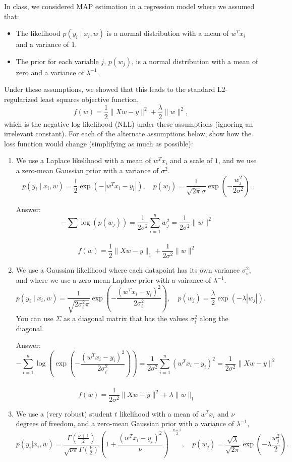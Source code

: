 \documentclass{article}
\def\ans#1{\par\gre{Answer: #1}}
\def\blu#1{{\color{blu}#1}}
\def\gre#1{{\color{gre}#1}}
\def\norm#1{\|#1\|}
\def\items#1{\begin{itemize}#1\end{itemize}}
\def\enum#1{\begin{enumerate}#1\end{enumerate}}
\begin{document}
In class, we considered MAP estimation in a regression model where we assumed that:
\items{
\item The likelihood $p(y_i \mid x_i, w)$ is a normal distribution with a mean of $w^Tx_i$ and a variance of $1$.
\item The prior for each variable $j$, $p(w_j)$, is a normal distribution with a mean of zero and a variance of $\lambda^{-1}$.
}
Under these assumptions, we showed that this leads to the standard L2-regularized least squares objective function,
\[
f(w) = \frac{1}{2}\norm{Xw - y}^2 + \frac \lambda 2 \norm{w}^2,
\]
which is the negative log likelihood (NLL) under these assumptions (ignoring an irrelevant constant).
\blu{For each of the alternate assumptions below, show how the loss function would change} (simplifying as much as possible):
\enum{
\item We use a Laplace likelihood with a mean of $w^Tx_i$ and a scale of $1$, and we use a zero-mean Gaussian prior with a variance of $\sigma^2$.
\[
p(y_i \mid x_i, w) = \frac 1 2 \exp(-|w^Tx_i - y_i|), \quad p(w_j) = \frac{1}{\sqrt{2\pi}\sigma}\exp\left(-\frac{w_j^2}{2\sigma^2}\right).
\]
\ans{
\[-\sum\log(p(w_j)) = \frac{1}{2\sigma^2} \sum_{i=1}^n w_j^2 = \frac{1}{2\sigma^2}\norm{w}^2\]\\
\[f(w) = \frac{1}{2}\norm{Xw - y}_1 +\frac{1}{2\sigma^2}\norm{w}^2 \]}
\item We use a Gaussian likelihood where each datapoint has its own variance $\sigma_i^2$, and where we use a zero-mean Laplace prior with a vairance of $\lambda^{-1}$.
\[
p(y_i \mid x_i,w) = \frac{1}{\sqrt{2\sigma_i^2\pi}}\exp\left(-\frac{(w^Tx_i - y_i)^2}{2\sigma_i^2}\right), \quad p(w_j) = \frac{\lambda}{2}\exp(-\lambda|w_j|).
\]
You can use $\Sigma$ as a diagonal matrix that has the values $\sigma_i^2$ along the diagonal.
\ans{
	\[ -\sum_{i=1}^n\log(\exp(-\frac{(w^Tx_i - y_i)^2}{2\sigma_i^2})) =\frac{1}{2\sigma^2}\sum_{i=1}^n(w^Tx_i - y_i)^2= \frac{1}{2\sigma^2}\norm{Xw-y}^2\]\\
	 \[ f(w) = \frac{1}{2\sigma^2}\norm{Xw - y}^2 +  \lambda \norm{w}_1 \]
}
\item We use a (very robust) student $t$ likelihood with a mean of $w^Tx_i$ and $\nu$ degrees of freedom, and a zero-mean Gaussian prior with a variance of $\lambda^{-1}$,
\[
p(y_i | x_i, w) = \frac{\Gamma\left(\frac{\nu + 1}{2}\right)}{\sqrt{\nu\pi}\Gamma\left(\frac \nu 2\right)}\left(1 + \frac{(w^Tx_i - y_i)^2}{\nu}\right)^{-\frac{\nu+1}{2}}, \quad p(w_j) = \frac{\sqrt{\lambda}}{\sqrt{2\pi}}\exp\left(-\lambda\frac{w_j^2}{2}\right).
\]}
\end{document}
